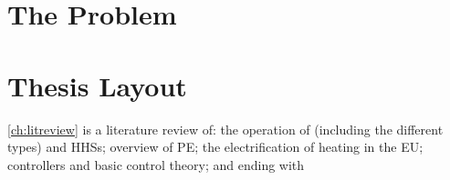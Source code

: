 \section{The Problem} %

\section{Thesis Layout}
\cref{ch:litreview} is a literature review of: the operation of \HPs (including the different types) and \acp{HHS}; overview of \ac{PE}; the electrification of heating in the EU; controllers and basic control theory; and ending with 
